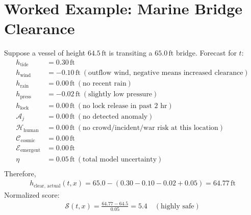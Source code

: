 \documentclass[12pt]{article}
\begin{document}
\section{Worked Example: Marine Bridge Clearance}
Suppose a vessel of height $64.5\,\mathrm{ft}$ is transiting a $65.0\,\mathrm{ft}$ bridge. Forecast for $t$:
\begin{align*}
h_{\text{tide}} &= 0.30\,\mathrm{ft} \\
h_{\text{wind}} &= -0.10\,\mathrm{ft} \ (\text{outflow wind, negative means increased clearance}) \\
h_{\text{rain}} &= 0.00\,\mathrm{ft} \ (\text{no recent rain}) \\
h_{\text{press}} &= -0.02\,\mathrm{ft} \ (\text{slightly low pressure}) \\
h_{\text{lock}} &= 0.00\,\mathrm{ft} \ (\text{no lock release in past 2 hr}) \\
\mathcal{A}_j &= 0.00\,\mathrm{ft} \ (\text{no detected anomaly}) \\
\mathcal{H}_{\text{human}} &= 0.00\,\mathrm{ft} \ (\text{no crowd/incident/war risk at this location}) \\
\mathcal{C}_{\text{cosmic}} &= 0.00\,\mathrm{ft} \\
\mathcal{E}_{\text{emergent}} &= 0.00\,\mathrm{ft} \\
\eta &= 0.05\,\mathrm{ft} \ (\text{total model uncertainty}) \\
\end{align*}
Therefore,
\begin{align*}
h_{\text{clear, actual}}(t, x) = 65.0 - (0.30 - 0.10 - 0.02 + 0.05) = 64.77\,\mathrm{ft}
\end{align*}
Normalized score:
\begin{align*}
\mathcal{S}(t, x) = \frac{64.77 - 64.5}{0.05} = 5.4 \quad (\text{highly safe})
\end{align*}
\end{document}
